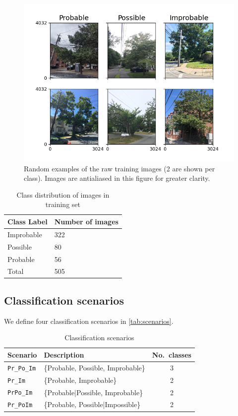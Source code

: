 \documentclass[Journal,letterpaper, SingleSpace, InsideFigs]{ascelike-new}
\begin{document}
\begin{figure}[h!]
  \centering
  \includegraphics[width=.7\textwidth]{raw_input_images_2}
  \caption{Random examples of the raw training images (2 are shown per class). Images are antialiased in this figure for greater clarity.}
  \label{fig:raw_images}
\end{figure}

\begin{table}[h!]\small
    \centering
    \begin{tabular}{l l}\toprule
    \bf Class Label     & \bf Number of images  \\ \midrule
    Improbable & 322\\
    Possible & 80 \\
    Probable & 56 \\\midrule
    Total & 505 \\\bottomrule
    \end{tabular}
    \caption{Class distribution of images in training set}
    \label{tab:classdist}
\end{table}

\subsection{Classification scenarios}
We define four classification scenarios in \autoref{tab:scenarios}. 

\begin{table}[h!]
    \centering
    \begin{tabular}{l l c}\toprule
    \bf Scenario            & \bf Description  & \bf No.\ classes\\\midrule
    \texttt{Pr\_Po\_Im}     &  \{Probable, Possible, Improbable\} & 3 \\
    \texttt{Pr\_Im}          & \{Probable, Improbable\}           & 2 \\
    \texttt{PrPo\_Im}        & \{Probable|Possible, Improbable\}  & 2 \\
    \texttt{Pr\_PoIm}        & \{Probable, Possible|Impossible\}  & 2 \\\bottomrule
    \end{tabular}
    \caption{Classification scenarios}
    \label{tab:scenarios}
\end{table}
\end{document}
